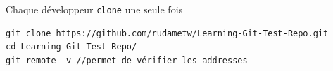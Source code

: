 \documentclass[table,tikz,12pt,svgnames]{beamer}
\begin{document}
\begin{frame}[fragile]
\begin{adjustwidth}{-0cm}{0cm}{}
	\begin{adjustwidth}{-0.5cm}{-3cm}{}
		\color{darkgreen}%
		Chaque développeur \texttt{clone} une seule fois
		\color{black}
		\begin{verbatim}
git clone https://github.com/rudametw/Learning-Git-Test-Repo.git
cd Learning-Git-Test-Repo/
git remote -v //permet de vérifier les addresses
		\end{verbatim}
		\end{adjustwidth}
	\end{adjustwidth}
\end{frame}

\end{document}
